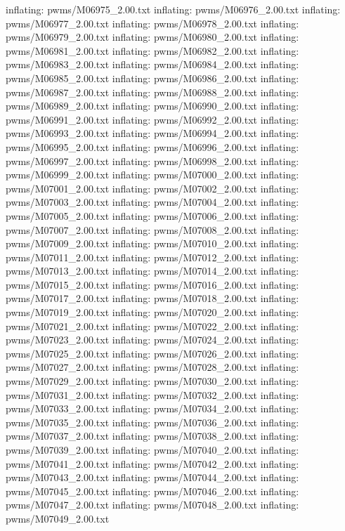 \documentclass[letterpaper,10pt,english]{sphinxmanual}
\begin{document}
{\begin{sphinxVerbatim}[commandchars=\\\{\}]
  inflating: pwms/M06975\_2.00.txt
  inflating: pwms/M06976\_2.00.txt
  inflating: pwms/M06977\_2.00.txt
  inflating: pwms/M06978\_2.00.txt
  inflating: pwms/M06979\_2.00.txt
  inflating: pwms/M06980\_2.00.txt
  inflating: pwms/M06981\_2.00.txt
  inflating: pwms/M06982\_2.00.txt
  inflating: pwms/M06983\_2.00.txt
  inflating: pwms/M06984\_2.00.txt
  inflating: pwms/M06985\_2.00.txt
  inflating: pwms/M06986\_2.00.txt
  inflating: pwms/M06987\_2.00.txt
  inflating: pwms/M06988\_2.00.txt
  inflating: pwms/M06989\_2.00.txt
  inflating: pwms/M06990\_2.00.txt
  inflating: pwms/M06991\_2.00.txt
  inflating: pwms/M06992\_2.00.txt
  inflating: pwms/M06993\_2.00.txt
  inflating: pwms/M06994\_2.00.txt
  inflating: pwms/M06995\_2.00.txt
  inflating: pwms/M06996\_2.00.txt
  inflating: pwms/M06997\_2.00.txt
  inflating: pwms/M06998\_2.00.txt
  inflating: pwms/M06999\_2.00.txt
  inflating: pwms/M07000\_2.00.txt
  inflating: pwms/M07001\_2.00.txt
  inflating: pwms/M07002\_2.00.txt
  inflating: pwms/M07003\_2.00.txt
  inflating: pwms/M07004\_2.00.txt
  inflating: pwms/M07005\_2.00.txt
  inflating: pwms/M07006\_2.00.txt
  inflating: pwms/M07007\_2.00.txt
  inflating: pwms/M07008\_2.00.txt
  inflating: pwms/M07009\_2.00.txt
  inflating: pwms/M07010\_2.00.txt
  inflating: pwms/M07011\_2.00.txt
  inflating: pwms/M07012\_2.00.txt
  inflating: pwms/M07013\_2.00.txt
  inflating: pwms/M07014\_2.00.txt
  inflating: pwms/M07015\_2.00.txt
  inflating: pwms/M07016\_2.00.txt
  inflating: pwms/M07017\_2.00.txt
  inflating: pwms/M07018\_2.00.txt
  inflating: pwms/M07019\_2.00.txt
  inflating: pwms/M07020\_2.00.txt
  inflating: pwms/M07021\_2.00.txt
  inflating: pwms/M07022\_2.00.txt
  inflating: pwms/M07023\_2.00.txt
  inflating: pwms/M07024\_2.00.txt
  inflating: pwms/M07025\_2.00.txt
  inflating: pwms/M07026\_2.00.txt
  inflating: pwms/M07027\_2.00.txt
  inflating: pwms/M07028\_2.00.txt
  inflating: pwms/M07029\_2.00.txt
  inflating: pwms/M07030\_2.00.txt
  inflating: pwms/M07031\_2.00.txt
  inflating: pwms/M07032\_2.00.txt
  inflating: pwms/M07033\_2.00.txt
  inflating: pwms/M07034\_2.00.txt
  inflating: pwms/M07035\_2.00.txt
  inflating: pwms/M07036\_2.00.txt
  inflating: pwms/M07037\_2.00.txt
  inflating: pwms/M07038\_2.00.txt
  inflating: pwms/M07039\_2.00.txt
  inflating: pwms/M07040\_2.00.txt
  inflating: pwms/M07041\_2.00.txt
  inflating: pwms/M07042\_2.00.txt
  inflating: pwms/M07043\_2.00.txt
  inflating: pwms/M07044\_2.00.txt
  inflating: pwms/M07045\_2.00.txt
  inflating: pwms/M07046\_2.00.txt
  inflating: pwms/M07047\_2.00.txt
  inflating: pwms/M07048\_2.00.txt
  inflating: pwms/M07049\_2.00.txt

\end{sphinxVerbatim}}
\end{document}
